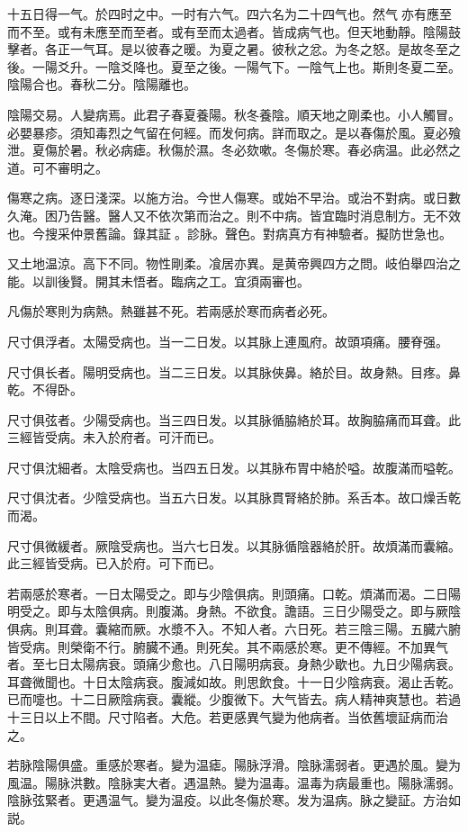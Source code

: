 十五日得一气。於四时之中。一时有六气。四六名为二十四气也。然气{\sungtpii 𠊱}亦有應至而不至。或有未應至而至者。或有至而太過者。皆成病气也。但天地動靜。陰陽鼓擊者。各正一气耳。是以彼春之暖。为夏之暑。彼秋之忿。为冬之怒。是故冬至之後。一陽爻升。一陰爻降也。夏至之後。一陽气下。一陰气上也。斯則冬夏二至。陰陽合也。春秋二分。陰陽離也。

陰陽交易。人變病焉。此君子春夏養陽。秋冬養陰。順天地之剛柔也。小人觸冒。必嬰暴疹。須知毒烈之气留在何經。而发何病。詳而取之。是以春傷於風。夏必飱泄。夏傷於暑。秋必病瘧。秋傷於濕。冬必欬嗽。冬傷於寒。春必病温。此必然之道。可不審明之。

傷寒之病。逐日淺深。以施方治。今世人傷寒。或始不早治。或治不對病。或日數久淹。困乃告醫。醫人又不依次第而治之。則不中病。皆宜臨时消息制方。无不效也。今搜采仲景舊論。錄其証{\sungtpii 𠊱}。診脉。聲色。對病真方有神驗者。擬防世急也。

又土地温涼。高下不同。物性剛柔。飡居亦異。是黄帝興四方之問。岐伯舉四治之能。以訓後賢。開其未悟者。臨病之工。宜須兩審也。

凡傷於寒則为病熱。熱雖甚不死。若兩感於寒而病者必死。

尺寸俱浮者。太陽受病也。当一二日发。以其脉上連風府。故頭項痛。腰脊强。

尺寸俱长者。陽明受病也。当二三日发。以其脉俠鼻。絡於目。故身熱。目疼。鼻乾。不得卧。

尺寸俱弦者。少陽受病也。当三四日发。以其脉循脇絡於耳。故胸脇痛而耳聋。此三經皆受病。未入於府者。可汗而已。

尺寸俱沈細者。太陰受病也。当四五日发。以其脉布胃中絡於嗌。故腹滿而嗌乾。

尺寸俱沈者。少陰受病也。当五六日发。以其脉貫腎絡於肺。系舌本。故口燥舌乾而渴。

尺寸俱微緩者。厥陰受病也。当六七日发。以其脉循陰器絡於肝。故煩滿而囊縮。此三經皆受病。已入於府。可下而已。

若兩感於寒者。一日太陽受之。即与少陰俱病。則頭痛。口乾。煩滿而渴。二日陽明受之。即与太陰俱病。則腹滿。身熱。不欲食。譫語。三日少陽受之。即与厥陰俱病。則耳聋。囊縮而厥。水漿不入。不知人者。六日死。若三陰三陽。五臓六腑皆受病。則榮衛不行。腑臓不通。則死矣。其不兩感於寒。更不傳經。不加異气者。至七日太陽病衰。頭痛少愈也。八日陽明病衰。身熱少歇也。九日少陽病衰。耳聋微聞也。十日太陰病衰。腹減如故。則思飲食。十一日少陰病衰。渴止舌乾。已而嚏也。十二日厥陰病衰。囊縱。少腹微下。大气皆去。病人精神爽慧也。若過十三日以上不間。尺寸陷者。大危。若更感異气變为他病者。当依舊壞証病而治之。

若脉陰陽俱盛。重感於寒者。變为温瘧。陽脉浮滑。陰脉濡弱者。更遇於風。變为風温。陽脉洪數。陰脉実大者。遇温熱。變为温毒。温毒为病最重也。陽脉濡弱。陰脉弦緊者。更遇温气。變为温疫。以此冬傷於寒。发为温病。脉之變証。方治如説。

